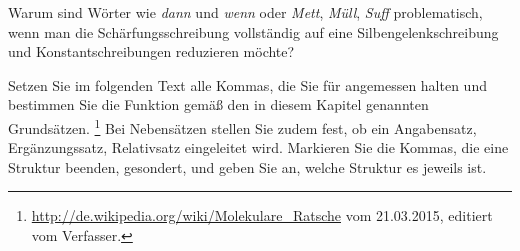 \Uebungen

 \label{exc:morphosyntaktischeschreibprinzipien01} Warum sind Wörter wie \textit{dann} und \textit{wenn} oder \textit{Mett}, \textit{Müll}, \textit{Suff} problematisch, wenn man die Schärfungsschreibung vollständig auf eine Silbengelenkschreibung und Konstantschreibungen reduzieren möchte?

 \label{exc:morphosyntaktischeschreibprinzipien02} Setzen Sie im folgenden Text alle Kommas, die Sie für angemessen halten und bestimmen Sie die Funktion gemäß den in diesem Kapitel genannten Grundsätzen.%
\footnote{\url{http://de.wikipedia.org/wiki/Molekulare_Ratsche} vom 21.03.2015, editiert vom Verfasser.}
Bei Nebensätzen stellen Sie zudem fest, ob ein Angabensatz, Ergänzungssatz, Relativsatz eingeleitet wird.
Markieren Sie die Kommas, die eine Struktur beenden, gesondert, und geben Sie an, welche Struktur es jeweils ist.

